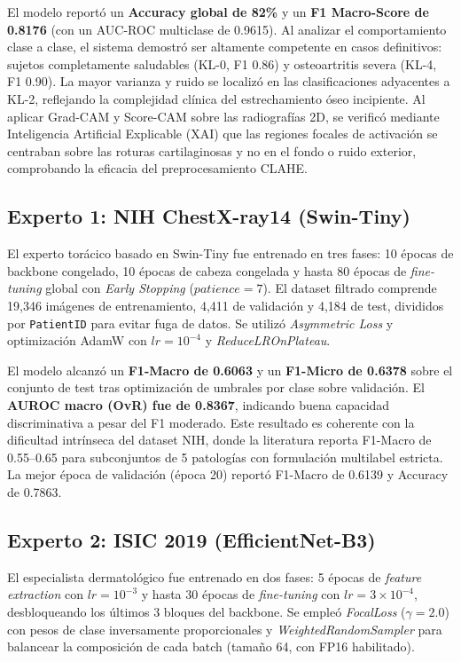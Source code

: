 \documentclass[conference, 11pt]{IEEEtran}
\begin{document}
El modelo reportó un \textbf{Accuracy global de 82\%} y un \textbf{F1 Macro-Score de 0.8176} (con un AUC-ROC multiclase de 0.9615). Al analizar el comportamiento clase a clase, el sistema demostró ser altamente competente en casos definitivos: sujetos completamente saludables (KL-0, F1 0.86) y osteoartritis severa (KL-4, F1 0.90). La mayor varianza y ruido se localizó en las clasificaciones adyacentes a KL-2, reflejando la complejidad clínica del estrechamiento óseo incipiente. Al aplicar Grad-CAM y Score-CAM sobre las radiografías 2D, se verificó mediante Inteligencia Artificial Explicable (XAI) que las regiones focales de activación se centraban sobre las roturas cartilaginosas y no en el fondo o ruido exterior, comprobando la eficacia del preprocesamiento CLAHE.

\subsection{Experto 1: NIH ChestX-ray14 (Swin-Tiny)}
El experto torácico basado en Swin-Tiny fue entrenado en tres fases: 10 épocas de backbone congelado, 10 épocas de cabeza congelada y hasta 80 épocas de \textit{fine-tuning} global con \textit{Early Stopping} ($patience=7$). El dataset filtrado comprende 19{,}346 imágenes de entrenamiento, 4{,}411 de validación y 4{,}184 de test, divididos por \texttt{PatientID} para evitar fuga de datos. Se utilizó \textit{Asymmetric Loss} y optimización AdamW con $lr=10^{-4}$ y \textit{ReduceLROnPlateau}.

El modelo alcanzó un \textbf{F1-Macro de 0.6063} y un \textbf{F1-Micro de 0.6378} sobre el conjunto de test tras optimización de umbrales por clase sobre validación. El \textbf{AUROC macro (OvR) fue de 0.8367}, indicando buena capacidad discriminativa a pesar del F1 moderado. Este resultado es coherente con la dificultad intrínseca del dataset NIH, donde la literatura reporta F1-Macro de 0.55--0.65 para subconjuntos de 5 patologías con formulación multilabel estricta. La mejor época de validación (época 20) reportó F1-Macro de 0.6139 y Accuracy de 0.7863.

\subsection{Experto 2: ISIC 2019 (EfficientNet-B3)}
El especialista dermatológico fue entrenado en dos fases: 5 épocas de \textit{feature extraction} con $lr=10^{-3}$ y hasta 30 épocas de \textit{fine-tuning} con $lr=3 \times 10^{-4}$, desbloqueando los últimos 3 bloques del backbone. Se empleó \textit{FocalLoss} ($\gamma=2.0$) con pesos de clase inversamente proporcionales y \textit{WeightedRandomSampler} para balancear la composición de cada batch (tamaño 64, con FP16 habilitado).
\end{document}
